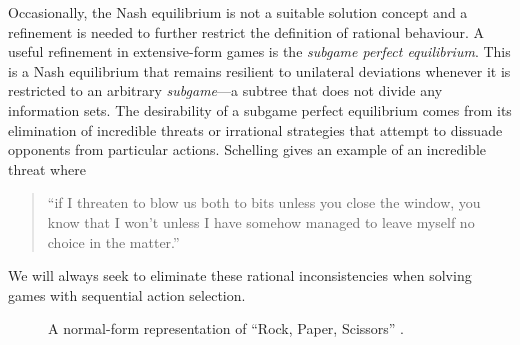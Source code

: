     Occasionally, the Nash equilibrium is not a suitable solution concept and a refinement is needed to further restrict the definition of rational behaviour.
    A useful refinement in extensive-form games is the \emph{subgame perfect equilibrium}.
    This is a Nash equilibrium that remains resilient to unilateral deviations whenever it is restricted to an arbitrary \emph{subgame}---a subtree that does not divide any information sets.
    The desirability of a subgame perfect equilibrium comes from its elimination of incredible threats or irrational strategies that attempt to dissuade opponents from particular actions.
    Schelling \parencite{Schelling1980} gives an example of an incredible threat where
    \begin{quote}
        ``if I threaten to blow us both to bits unless you close the window, you know that I won't unless I have somehow managed to leave myself no choice in the matter.''
    \end{quote}
    We will always seek to eliminate these rational inconsistencies when solving games with sequential action selection.

    \begin{figure}[h]
        \centering
        
        \caption[``Rock, Paper, Scissors'' in Normal Form]{A normal-form representation of ``Rock, Paper, Scissors'' \parencite{Maschler2013}.}
        \label{fig:normal-rock-paper-scissors}
    \end{figure}



